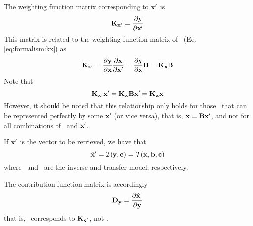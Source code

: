   The weighting function matrix corresponding to $\mathbf{x}'$ is
  \begin{equation}
    \mathbf{K}_{\mathbf{x}'} = \frac{\partial \mathbf{y}}{\partial \mathbf{x}'}
  \end{equation}
  This matrix is related to the weighting function matrix of \SttVct\ (Eq.
  \ref{eq:formalism:kx}) as
  \begin{equation}
    \mathbf{K}_{\mathbf{x}'} = \frac{\partial \mathbf{y}}{\partial \mathbf{x}} 
                         \frac{\partial \mathbf{x}}{\partial \mathbf{x}'}
                       = \frac{\partial \mathbf{y}}{\partial \mathbf{x}} \mathbf{B}
                       = \mathbf{K}_{\mathbf{x}} \mathbf{B}
  \end{equation}
  Note that
  \begin{equation}
    \mathbf{K}_{\mathbf{x}'}\mathbf{x}' = \mathbf{K}_{\mathbf{x}}\mathbf{B}\mathbf{x}' 
                                                    =  \mathbf{K}_{\mathbf{x}}\mathbf{x}
  \end{equation}
  However, it should be noted that this relationship only holds for
  those \SttVct\ that can be represented perfectly by some $\mathbf{x}'$
  (or vice versa), that is, $\mathbf{x}=\mathbf{B}\mathbf{x}'$, and not for
  all combinations of \SttVct\ and $\mathbf{x}'$.

  If $\mathbf{x}'$ is the vector to be retrieved, we have that \citep{rodgers:90}
  \begin{equation}
    \hat{\mathbf{x}}' = \mathcal{I}(\mathbf{y},\mathbf{c}) = 
                                         \mathcal{T}(\mathbf{x},\mathbf{b},\mathbf{c})
  \end{equation}
  where \InvMdl\ and \TrfMdl\ are the inverse and transfer model, respectively.

  The contribution function matrix is accordingly
  \begin{equation}
    \mathbf{D_y} =  \frac{\partial \hat{\mathbf{x}}'}{\partial \mathbf{y}}
  \end{equation}
  that is, \CtrFncMtr\ corresponds to $\mathbf{K}_{\mathbf{x}'}$, not 
  \aWfnMtr{\SttVct}.
  
